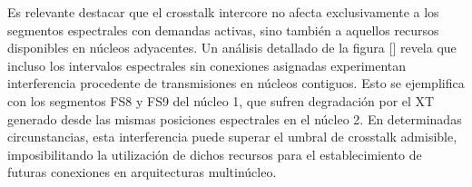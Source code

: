 Es relevante destacar que el crosstalk intercore no afecta exclusivamente a los segmentos espectrales con demandas activas, sino también a aquellos recursos disponibles en núcleos adyacentes. Un análisis detallado de la figura [] revela que incluso los intervalos espectrales sin conexiones asignadas experimentan interferencia procedente de transmisiones en núcleos contiguos.
 Esto se ejemplifica con los segmentos FS8 y FS9 del núcleo 1, que sufren degradación por el XT generado desde las mismas posiciones espectrales en el núcleo 2. En determinadas circunstancias, esta interferencia puede superar el umbral de crosstalk admisible, imposibilitando la utilización de dichos recursos para el establecimiento de futuras conexiones en arquitecturas multinúcleo.







